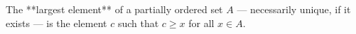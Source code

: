 The **largest element** of a partially ordered set $A$ — necessarily unique, if it exists — is the element $c$ such that $c \geq x$ for all $x \in A$.
